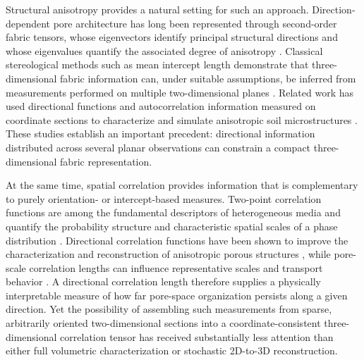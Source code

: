 \documentclass{article}
\begin{document}
Structural anisotropy provides a natural setting for such an approach. Direction-dependent pore architecture has long been represented through second-order fabric tensors, whose eigenvectors identify principal structural directions and whose eigenvalues quantify the associated degree of anisotropy \cite{Kanatani1985,Inglis2003,Cowin2004,Tabor2012}. Classical stereological methods such as mean intercept length demonstrate that three-dimensional fabric information can, under suitable assumptions, be inferred from measurements performed on multiple two-dimensional planes \cite{Kanatani1985,Inglis2003}. Related work has used directional functions and autocorrelation information measured on coordinate sections to characterize and simulate anisotropic soil microstructures \cite{MasadMuhunthan2000}. These studies establish an important precedent: directional information distributed across several planar observations can constrain a compact three-dimensional fabric representation.

At the same time, spatial correlation provides information that is complementary to purely orientation- or intercept-based measures. Two-point correlation functions are among the fundamental descriptors of heterogeneous media and quantify the probability structure and characteristic spatial scales of a phase distribution \cite{Torquato2002,Jiao2007}. Directional correlation functions have been shown to improve the characterization and reconstruction of anisotropic porous structures \cite{Gerke2014}, while pore-scale correlation lengths can influence representative scales and transport behavior \cite{Singh2020,Zubov2024}. A directional correlation length therefore supplies a physically interpretable measure of how far pore-space organization persists along a given direction. Yet the possibility of assembling such measurements from sparse, arbitrarily oriented two-dimensional sections into a coordinate-consistent three-dimensional correlation tensor has received substantially less attention than either full volumetric characterization or stochastic 2D-to-3D reconstruction.
\end{document}
